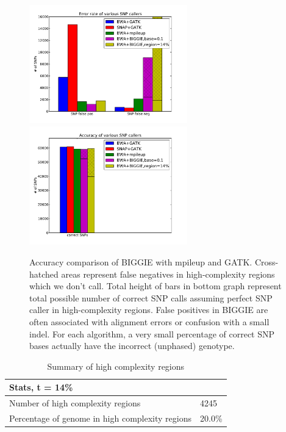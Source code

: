 \documentclass[10pt]{article}
\begin{document}
\begin{figure}[h!]
	\includegraphics[width=2.7in]{figs/variant_call_results_all.pdf} \hspace{5mm}
	\includegraphics[width=2.7in]{figs/correct_results_all.pdf}
	\caption{Accuracy comparison of BIGGIE with mpileup and GATK.
  Cross-hatched areas represent false negatives in high-complexity regions which we don't call.
  Total height of bars in bottom graph represent total possible number of correct SNP calls assuming perfect SNP caller in high-complexity regions.
  False positives in BIGGIE are often associated with alignment errors or confusion with a small indel.
  For each algorithm, a very small percentage of correct SNP bases actually have the incorrect (unphased) genotype.} %
\end{figure}

\begin{table}[h]
  \centering
  \small
  \begin{tabular}{| p{5cm} | p{0.8cm} |}
    \hline
    Stats, t = 14\% & \\
    \hline
    Number of high complexity regions & 4245 \\
    Percentage of genome in high complexity regions & 20.0\% \\
    \hline
  \end{tabular}
  \caption{Summary of high complexity regions}
  \label{tab:complexity}
\end{table}
\end{document}
